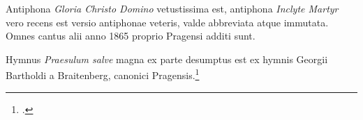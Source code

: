 Antiphona \emph{Gloria Christo Domino} vetustissima est,
antiphona \emph{Inclyte Martyr} vero recens est versio antiphonae veteris,
valde abbreviata atque immutata.
Omnes cantus alii anno 1865 proprio Pragensi additi sunt.

Hymnus \emph{Praesulum salve} magna ex parte desumptus est ex hymnis Georgii Bartholdi a Braitenberg,
canonici Pragensis.\footcite[134]{pontanus1590}
